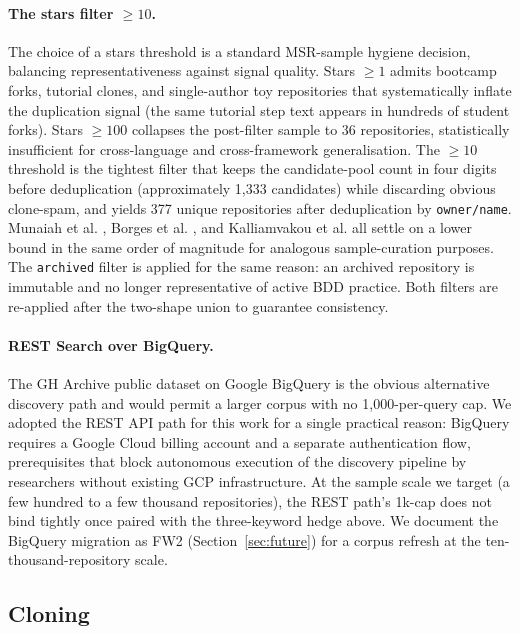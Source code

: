 \documentclass[11pt,a4paper]{article}
\begin{document}
\paragraph{The stars filter \(\geq 10\).} The choice of a stars
threshold is a standard MSR-sample hygiene decision, balancing
representativeness against signal quality. Stars \(\geq 1\) admits
bootcamp forks, tutorial clones, and single-author toy repositories
that systematically inflate the duplication signal (the same
tutorial step text appears in hundreds of student forks). Stars
\(\geq 100\) collapses the post-filter sample to 36 repositories,
statistically insufficient for cross-language and cross-framework
generalisation. The \(\geq 10\) threshold is the tightest filter
that keeps the candidate-pool count in four digits before
deduplication (approximately 1{,}333 candidates) while discarding
obvious clone-spam, and yields 377 unique repositories after
deduplication by \texttt{owner/name}. Munaiah et al.
\citep{munaiah2017sample}, Borges et al.
\citep{borges2016github}, and Kalliamvakou et al.
\citep{kalliamvakou2014ghq} all settle on a lower bound in the
same order of magnitude for analogous sample-curation purposes.
The \texttt{archived} filter is applied for the same reason: an
archived repository is immutable and no longer representative of
active BDD practice. Both filters are re-applied after the
two-shape union to guarantee consistency.

\paragraph{REST Search over BigQuery.} The GH Archive public
dataset on Google BigQuery
\citep{ghtorrent2012,ghtorrent2014} is the obvious alternative
discovery path and would permit a larger corpus with no
1{,}000-per-query cap. We adopted the REST API path for this work
for a single practical reason: BigQuery requires a Google Cloud
billing account and a separate authentication flow, prerequisites
that block autonomous execution of the discovery pipeline by
researchers without existing GCP infrastructure. At the sample
scale we target (a few hundred to a few thousand repositories),
the REST path's 1k-cap does not bind tightly once paired with the
three-keyword hedge above. We document the BigQuery migration as
FW2 (Section~\ref{sec:future}) for a corpus refresh at the ten-
thousand-repository scale.

\subsection{Cloning}
\end{document}
